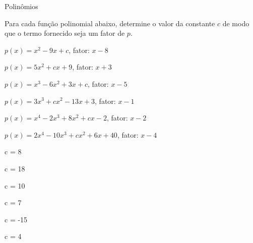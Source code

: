 \begin{exercicios}{Polinômios}
    \begin{exercicio}
        Para cada função polinomial abaixo, determine o valor da constante $c$ de modo que o termo fornecido seja um fator de $p$.
        \begin{alphalist}
            \item $p(x) = x^2 - 9x + c$,                   \tabto{55mm} fator: $x-8$
            \item $p(x) = 5x^2 + cx + 9$,                  \tabto{55mm} fator: $x+3$
            \item $p(x) = x^3 - 6x^2 + 3x + c$,            \tabto{55mm} fator: $x-5$
            \item $p(x) = 3x^3 + cx^2 - 13x + 3$,          \tabto{55mm} fator: $x-1$
            \item $p(x) = x^4 - 2x^3 + 8x^2 + cx - 2$,     \tabto{55mm} fator: $x-2$
            \item $p(x) = 2x^4 - 10x^3 + cx^2 + 6x + 40$,  \tabto{55mm} fator: $x-4$
        \end{alphalist}
        \begin{answers}
            \begin{mathlist}[3]
                \item c = 8
                \item c = 18
                \item c = 10
                \item c = 7
                \item c = -15
                \item c = 4
            \end{mathlist}
        \end{answers}
    \end{exercicio}
    

\end{exercicios}
